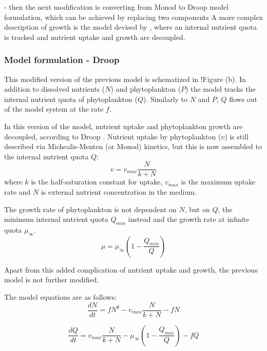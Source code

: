 

- then the next modification is converting from Monod to Droop model formulation, which can be achieved by replacing two components
A more complex description of growth is the model devised by \citet{Droop1968VitaminLutheri}, where an internal nutrient quota is tracked and nutrient uptake and growth are decoupled. 


\subsubsection{Model formulation - Droop}
This modified version of the previous model is schematized in !Figure (b). In addition to dissolved nutrients ($N$) and phytoplankton ($P$) the model tracks the internal nutrient quota of phytoplankton ($Q$). Similarly to $N$ and $P$, $Q$ flows out of the model system at the rate $f$.

In this version of the model, nutrient uptake and phytoplankton growth are decoupled, according to Droop \citep{Droop1968VitaminLutheri}.
Nutrient uptake by phytoplankton ($v$) is still described via Michealis-Menten (or Monod) kinetics, but this is now assembled to the internal nutrient quota $Q$:
\begin{equation}
    v = v_{max} \frac{N}{k + N}
\end{equation}
where $k$ is the half-saturation constant for uptake, $v_{max}$ is the maximum uptake rate and $N$ is external nutrient concentration in the medium.

The growth rate of phytoplankton is not dependent on $N$, but on $Q$, the minimum internal nutrient quota $Q_{min}$ instead and the growth rate at infinite quota $\mu_\infty$.
\begin{equation}
    \mu = \mu_\infty (1 - \frac{Q_{min}}{Q})
\end{equation}

Apart from this added complication of nutrient uptake and growth, the previous model is not further modified.

The model equations are as follows:
\begin{equation}
    \frac{d N}{d t} = 
    f N^\emptyset %
    -  v_{max} \frac{N}{k + N} 
    - f N
\end{equation}

\begin{equation}
    \frac{d Q}{d t} = 
    v_{max} \frac{N}{k + N} 
    - \mu_\infty (1 - \frac{Q_{min}}{Q})
    - f Q
\end{equation}

